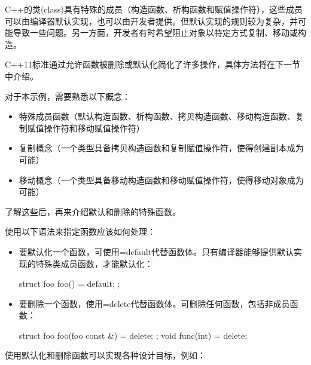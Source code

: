 
C++的类(class)具有特殊的成员（构造函数、析构函数和赋值操作符），这些成员可以由编译器默认实现，也可以由开发者提供。但默认实现的规则较为复杂，并可能导致一些问题。另一方面，开发者有时希望阻止对象以特定方式复制、移动或构造。

C++11标准通过允许函数被删除或默认化简化了许多操作，具体方法将在下一节中介绍。


对于本示例，需要熟悉以下概念：

\begin{itemize}
\item
特殊成员函数（默认构造函数、析构函数、拷贝构造函数、移动构造函数、复制赋值操作符和移动赋值操作符）

\item
复制概念（一个类型具备拷贝构造函数和复制赋值操作符，使得创建副本成为可能）

\item
移动概念（一个类型具备移动构造函数和移动赋值操作符，使得移动对象成为可能）
\end{itemize}

了解这些后，再来介绍默认和删除的特殊函数。


使用以下语法来指定函数应该如何处理：

\begin{itemize}
\item
要默认化一个函数，可使用=default代替函数体。只有编译器能够提供默认实现的特殊类成员函数，才能默认化：

\begin{cpp}
struct foo
{
    foo() = default;
};
\end{cpp}

\item
要删除一个函数，使用=delete代替函数体。可删除任何函数，包括非成员函数：

\begin{cpp}
struct foo
{
    foo(foo const &) = delete;
};
void func(int) = delete;
\end{cpp}
\end{itemize}

使用默认化和删除函数可以实现各种设计目标，例如：

